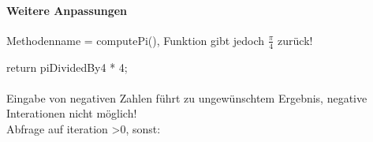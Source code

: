 \documentclass[10pt, a4paper]{article}
\begin{document}
\paragraph{Weitere Anpassungen}
Methodenname = computePi(), Funktion gibt jedoch $\frac{\pi}{4}$ zurück!\\
\begin{numVblock}
return piDividedBy4 * 4;
\end{numVblock}
\par
\paragraph{}
Eingabe von negativen Zahlen führt zu ungewünschtem Ergebnis, negative Interationen nicht möglich!\\
Abfrage auf iteration \textgreater 0, sonst:\\
\begin{numVblock}
} else {
throw new IllegalArgumentException()
}
\end{numVblock}\par
\end{document}
